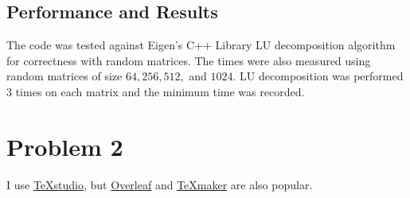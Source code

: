\documentclass[12pt,letterpaper]{article}
\begin{document}
\subsection{Performance and Results}
The code was tested against Eigen's C++ Library LU decomposition algorithm for correctness with random matrices. The times were also measured using random matrices of size \(64, 256, 512,\) and \(1024\). LU decomposition was performed 3 times on each matrix and the minimum time was recorded.
\section*{Problem 2}
 I use \href{http://texstudio.sourceforge.net/}{\TeX studio}, but \href{https://www.overleaf.com/project}{Overleaf} and \href{https://www.xm1math.net/texmaker/}{\TeX maker} are also popular.
\end{document}
